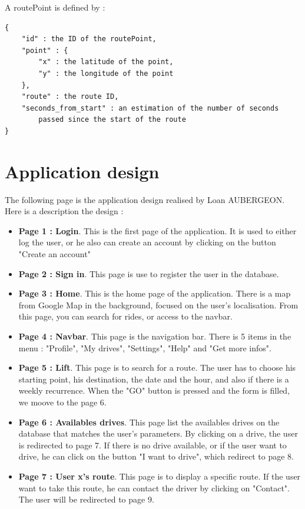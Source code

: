 A routePoint is defined by :
\begin{lstlisting}[style=DOS]
{
	"id" : the ID of the routePoint,
	"point" : {
		"x" : the latitude of the point,
		"y" : the longitude of the point
	},
	"route" : the route ID,
	"seconds_from_start" : an estimation of the number of seconds
		passed since the start of the route
}
\end{lstlisting}


\section{Application design}

The following page is the application design realised by Loan AUBERGEON. Here is a description the design :

\begin{itemize}
	\item {\bf Page 1 : Login}. This is the first page of the application. It is used to either log the user, or he also can create an account by clicking on the button "Create an account"
	\item {\bf Page 2 : Sign in}. This page is use to register the user in the database. 
	\item {\bf Page 3 : Home}. This is the home page of the application. There is a map from Google Map in the background, focused on the user's localisation. From this page, you can search for rides, or access to the navbar.
	\item {\bf Page 4 : Navbar}. This page is the navigation bar. There is 5 items in the menu : "Profile", "My drives", "Settings", "Help" and "Get more infos".
	\item {\bf Page 5 : Lift}. This page is to search for a route. The user has to choose his starting point, his destination, the date and the hour, and also if there is a weekly recurrence. When the "GO" button is pressed and the form is filled, we moove to the page 6.
	\item {\bf Page 6 : Availables drives}. This page list the availables drives on the database that matches the user's parameters. By clicking on a drive, the user is redirected to page 7. If there is no drive available, or if the user want to drive, he can click on the button "I want to drive", which redirect to page 8.
	\item {\bf Page 7 : User x's route}. This page is to display a specific route. If the user want to take this route, he can contact the driver by clicking on "Contact". The user will be redirected to page 9.

\end{itemize}
